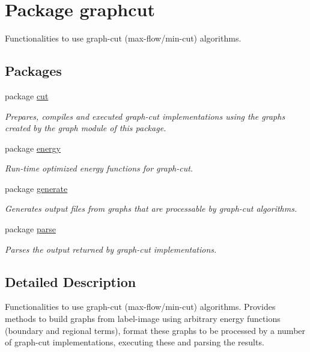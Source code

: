 \hypertarget{namespacegraphcut}{
\section{Package graphcut}
\label{namespacegraphcut}
}


Functionalities to use graph-\/cut (max-\/flow/min-\/cut) algorithms.  


\subsection*{Packages}
\begin{DoxyCompactItemize}
\item 
package \hyperlink{namespacegraphcut_1_1cut}{cut}


\begin{DoxyCompactList}\small\item\em Prepares, compiles and executed graph-\/cut implementations using the graphs created by the graph module of this package. \end{DoxyCompactList}

\item 
package \hyperlink{namespacegraphcut_1_1energy}{energy}


\begin{DoxyCompactList}\small\item\em Run-\/time optimized energy functions for graph-\/cut. \end{DoxyCompactList}

\item 
package \hyperlink{namespacegraphcut_1_1generate}{generate}


\begin{DoxyCompactList}\small\item\em Generates output files from graphs that are processable by graph-\/cut algorithms. \end{DoxyCompactList}

\item 
package \hyperlink{namespacegraphcut_1_1parse}{parse}


\begin{DoxyCompactList}\small\item\em Parses the output returned by graph-\/cut implementations. \end{DoxyCompactList}

\end{DoxyCompactItemize}


\subsection{Detailed Description}
Functionalities to use graph-\/cut (max-\/flow/min-\/cut) algorithms. Provides methods to build graphs from label-\/image using arbitrary energy functions (boundary and regional terms), format these graphs to be processed by a number of graph-\/cut implementations, executing these and parsing the results.

